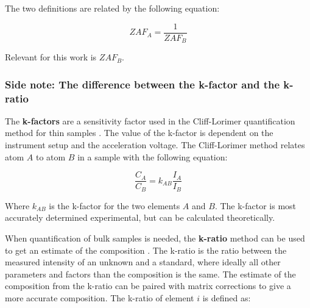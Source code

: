 The two definitions are related by the following equation:

\begin{equation}
    \label{eq:theory:quantitative:zaf_a_b_relation}
    ZAF_A = \frac{1}{ZAF_B}
\end{equation}

Relevant for this work is $ZAF_B$.





\subsubsection*{Side note: The difference between the k-factor and the k-ratio}
\label{sec:theory:quantitative:k_factor_vs_k_ratio}


The \textbf{k-factors} are a sensitivity factor used in the Cliff-Lorimer quantification method for thin samples \cite{CL1975,williams_carter_tem_2009}.
The value of the k-factor is dependent on the instrument setup and the acceleration voltage.
The Cliff-Lorimer method relates atom $A$ to atom $B$ in a sample with the following equation:

\begin{equation}
    \label{eq:theory:quantitative:cliff_lorimer}
    \frac{C_A}{C_B} = k_{AB} \frac{I_A}{I_B}
\end{equation}

Where $k_{AB}$ is the k-factor for the two elements $A$ and $B$.
The k-factor is most accurately determined experimental, but can be calculated theoretically.


When quantification of bulk samples is needed, the \textbf{k-ratio} method can be used to get an estimate of the composition \cite[Ch. 19.1]{goldstein_scanning_2018}.
The k-ratio is the ratio between the measured intensity of an unknown and a standard, where ideally all other parameters and factors than the composition is the same.
The estimate of the composition from the k-ratio can be paired with matrix corrections to give a more accurate composition.
The k-ratio of element $i$ is defined as:

